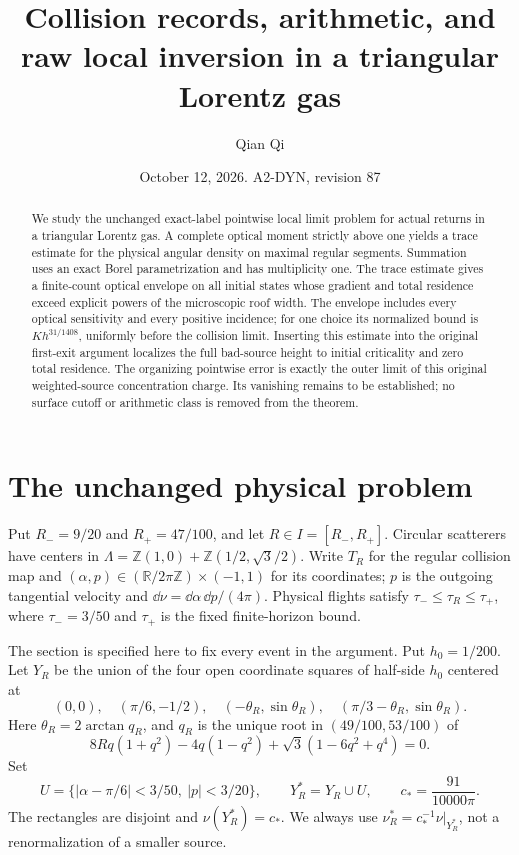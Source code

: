 \documentclass[11pt,reqno]{amsart}
\title[Collision records and raw local inversion]{Collision records, arithmetic, and raw local inversion in a triangular Lorentz gas}
\author{Qian Qi}
\date{October 12, 2026. A2-DYN, revision 87}
\numberwithin{equation}{section}
\theoremstyle{definition}
\theoremstyle{remark}\newtheorem{remark}[theorem]{Remark}
\newcommand{\R}{\mathbb R}\newcommand{\Z}{\mathbb Z}
\begin{document}
\raggedbottom
\begin{abstract}
We study the unchanged exact-label pointwise local limit problem for
actual returns in a triangular Lorentz gas. A complete optical moment
strictly above one yields a trace estimate for the physical angular
density on maximal regular segments. Summation uses an exact Borel
parametrization and has multiplicity one. The trace estimate gives a
finite-count optical envelope on all initial states whose gradient and
total residence exceed explicit powers of the microscopic roof width.
The envelope includes every optical sensitivity and every positive
incidence; for one choice its normalized bound is $K h^{31/1408}$,
uniformly before the collision limit. Inserting this estimate into the
original first-exit argument localizes the full bad-source height to
initial criticality and zero total residence. The organizing pointwise
error is exactly the outer limit of this original weighted-source
concentration charge. Its vanishing remains to be established; no
surface cutoff or arithmetic class is removed from the theorem.
\end{abstract}
\maketitle

\section{The unchanged physical problem}
Put $R_-=9/20$ and $R_+=47/100$, and let $R\in I=[R_-,R_+]$. Circular scatterers have centers in
$\Lambda=\Z(1,0)+\Z(1/2,\sqrt3/2)$. Write $T_R$ for the regular
collision map and $(\alpha,p)\in(\R/2\pi\Z)\times(-1,1)$ for its
coordinates; $p$ is the outgoing tangential velocity and
$\dd\nu=\dd\alpha\,\dd p/(4\pi)$. Physical flights satisfy
$\tau_-\le\tau_R\le\tau_+$, where $\tau_-=3/50$ and $\tau_+$
is the fixed finite-horizon bound.

The section is specified here to fix every event in the argument.
Put $h_0=1/200$. Let $Y_R$ be the union of the four open coordinate
squares of half-side $h_0$ centered at
\[
 (0,0),\quad(\pi/6,-1/2),\quad
 (-\theta_R,\sin\theta_R),\quad
 (\pi/3-\theta_R,\sin\theta_R).
\]
Here $\theta_R=2\arctan q_R$, and $q_R$ is the unique root in
$(49/100,53/100)$ of
\[
 8Rq(1+q^2)-4q(1-q^2)+\sqrt3(1-6q^2+q^4)=0.
\]
Set
\[
 U=\{|\alpha-\pi/6|<3/50,\ |p|<3/20\},\qquad
 Y_R^*=Y_R\cup U,\qquad c_*=\frac{91}{10000\pi}.
\]
The rectangles are disjoint and $\nu(Y_R^*)=c_*$. We always use
$\nu_R^*=c_*^{-1}\nu|_{Y_R^*}$, not a renormalization of a smaller
source.
\end{document}
